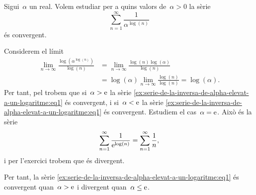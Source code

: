 \documentclass[../../main.tex]{subfiles}
\begin{document}
    \begin{example}
        \label{ex:serie-de-la-inversa-de-alpha-elevat-a-un-logaritme}
        Sigui~\(\alpha\) un real.
        Volem estudiar per a quins valors de~\(\alpha>0\) la sèrie
        \begin{equation}
            \label{ex:serie-de-la-inversa-de-alpha-elevat-a-un-logaritme:eq1}
            \sum_{n=1}^{\infty}\frac{1}{\alpha^{\log(n)}}
        \end{equation}
        és convergent.
    \end{example}
    \begin{solution}
        Considerem el límit
        \begin{align*}
            \lim_{n\to\infty}\frac{\log\left(\alpha^{\log(n)}\right)}{\log(n)}&=\lim_{n\to\infty}\frac{\log(n)\log(\alpha)}{\log(n)} \\
            &=\log(\alpha)\lim_{n\to\infty}\frac{\log(n)}{\log(n)}=\log(\alpha).
        \end{align*}
        Per tant, pel  trobem que si~\(\alpha>\mathrm{e}\) la sèrie \eqref{ex:serie-de-la-inversa-de-alpha-elevat-a-un-logaritme:eq1} és convergent, i si~\(\alpha<\mathrm{e}\) la sèrie \eqref{ex:serie-de-la-inversa-de-alpha-elevat-a-un-logaritme:eq1} és convergent.
        Estudiem el cas~\(\alpha=\mathrm{e}\).
        Això és la sèrie
        \[
            \sum_{n=1}^{\infty}\frac{1}{\mathrm{e}^{\log(n)}}=\sum_{n=1}^{\infty}\frac{1}{n},
        \]
        i per l'exercici  trobem que és divergent.

        Per tant, la sèrie \eqref{ex:serie-de-la-inversa-de-alpha-elevat-a-un-logaritme:eq1} és convergent quan~\(\alpha>\mathrm{e}\) i divergent quan~\(\alpha\leq\mathrm{e}\).
    \end{solution}
\end{document}
